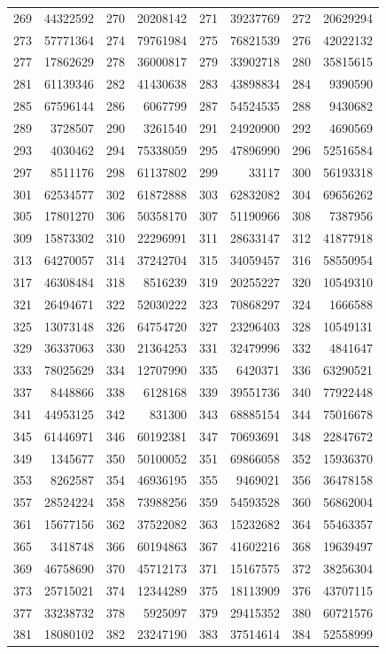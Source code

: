 \begin{longtable}{|r|r|r|r|r|r|r|r|}
269 & 44322592 & 270 & 20208142 & 271 & 39237769 & 272 & 20629294 \\
273 & 57771364 & 274 & 79761984 & 275 & 76821539 & 276 & 42022132 \\
277 & 17862629 & 278 & 36000817 & 279 & 33902718 & 280 & 35815615 \\
281 & 61139346 & 282 & 41430638 & 283 & 43898834 & 284 & 9390590 \\
285 & 67596144 & 286 & 6067799 & 287 & 54524535 & 288 & 9430682 \\
289 & 3728507 & 290 & 3261540 & 291 & 24920900 & 292 & 4690569 \\
293 & 4030462 & 294 & 75338059 & 295 & 47896990 & 296 & 52516584 \\
297 & 8511176 & 298 & 61137802 & 299 & 33117 & 300 & 56193318 \\
301 & 62534577 & 302 & 61872888 & 303 & 62832082 & 304 & 69656262 \\
305 & 17801270 & 306 & 50358170 & 307 & 51190966 & 308 & 7387956 \\
309 & 15873302 & 310 & 22296991 & 311 & 28633147 & 312 & 41877918 \\
313 & 64270057 & 314 & 37242704 & 315 & 34059457 & 316 & 58550954 \\
317 & 46308484 & 318 & 8516239 & 319 & 20255227 & 320 & 10549310 \\
321 & 26494671 & 322 & 52030222 & 323 & 70868297 & 324 & 1666588 \\
325 & 13073148 & 326 & 64754720 & 327 & 23296403 & 328 & 10549131 \\
329 & 36337063 & 330 & 21364253 & 331 & 32479996 & 332 & 4841647 \\
333 & 78025629 & 334 & 12707990 & 335 & 6420371 & 336 & 63290521 \\
337 & 8448866 & 338 & 6128168 & 339 & 39551736 & 340 & 77922448 \\
341 & 44953125 & 342 & 831300 & 343 & 68885154 & 344 & 75016678 \\
345 & 61446971 & 346 & 60192381 & 347 & 70693691 & 348 & 22847672 \\
349 & 1345677 & 350 & 50100052 & 351 & 69866058 & 352 & 15936370 \\
353 & 8262587 & 354 & 46936195 & 355 & 9469021 & 356 & 36478158 \\
357 & 28524224 & 358 & 73988256 & 359 & 54593528 & 360 & 56862004 \\
361 & 15677156 & 362 & 37522082 & 363 & 15232682 & 364 & 55463357 \\
365 & 3418748 & 366 & 60194863 & 367 & 41602216 & 368 & 19639497 \\
369 & 46758690 & 370 & 45712173 & 371 & 15167575 & 372 & 38256304 \\
373 & 25715021 & 374 & 12344289 & 375 & 18113909 & 376 & 43707115 \\
377 & 33238732 & 378 & 5925097 & 379 & 29415352 & 380 & 60721576 \\
381 & 18080102 & 382 & 23247190 & 383 & 37514614 & 384 & 52558999 \\
\end{longtable}


